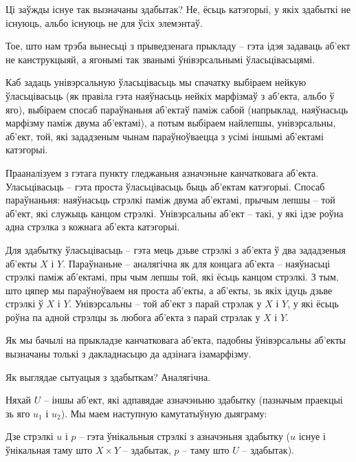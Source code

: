 \documentclass[a4paper,12pt]{book}
\begin{document}
Ці заўжды існуе так вызначаны здабытак? Не, ёсьць катэгорыі, у якіх
здабыткі не існуюць, альбо існуюць не для ўсіх элемэнтаў.

Тое, што нам трэба вынесьці з прыведзенага прыкладу -- гэта ідэя
задаваць аб'ект не канструкцыяй, а ягонымі так званымі ўнівэрсальнымі
ўласьцівасьцямі.

Каб задаць унівэрсальную ўласьцівасьць мы спачатку выбіраем нейкую
ўласьцівасьць (як правіла гэта наяўнасьць нейкіх марфізмаў з аб'екта,
альбо ў яго), выбіраем спосаб параўнаньня аб'ектаў паміж сабой
(напрыклад, наяўнасьць марфізму паміж двума аб'ектамі), а потым
выбіраем найлепшы, унівэрсальны, аб'ект, той, які зададзеным чынам
параўноўваецца з усімі іншымі аб'ектамі катэгорыі.

Прааналізуем з гэтага пункту гледжаньня азначэньне канчатковага
аб'екта. Уласьцівасьць -- гэта проста ўласьцівасьць быць аб'ектам
катэгорыі. Спосаб параўнаньня: наяўнасьць стрэлкі паміж двума
аб'ектамі, прычым лепшы -- той аб'ект, які служыць канцом
стрэлкі. Унівэрсальны аб'ект -- такі, у які ідзе роўна адна стрэлка з
кожнага аб'екта катэгорыі.

Для здабытку ўласьцівасьць -- гэта мець дзьве стрэлкі з аб'екта ў два
зададзеныя аб'екты $X$ і $Y$. Параўнаньне -- аналягічна як для концага
аб'екта
-- наяўнасьці стрэлкі паміж аб'ектамі, пры чым лепшы той, які ёсьць
канцом стрэлкі. З тым, што цяпер мы параўноўваем ня проста аб'екты, а
аб'екты, зь якіх ідуць дзьве стрэлкі ў $X$ і $Y$.
Унівэрсальны -- той аб'ект з парай стрэлак у $X$ і $Y$, у які ёсьць роўна
па адной стрэлцы зь любога аб'екта з парай стрэлак у $X$ і $Y$.

Як мы бачылі на прыкладзе канчатковага аб'екта, падобны ўнівэрсальны
аб'екты вызначаны толькі з дакладнасьцю да адзінага ізамарфізму.

Як выглядае сытуацыя з здабыткам? Аналягічна.

Няхай $U$ -- іншы аб'ект, які адпавядае азначэньню здабытку (пазначым
праекцыі зь яго $u_1$ і $u_2$). Мы маем
наступную камутатыўную дыяграму:


Дзе стрэлкі $u$ і $p$ -- гэта ўнікальныя стрэлкі з азначэньня здабытку
($u$ існуе і ўнікальная таму што $X \times Y$ -- здабытак, $p$ -- таму
што $U$ -- здабытак).
\end{document}
